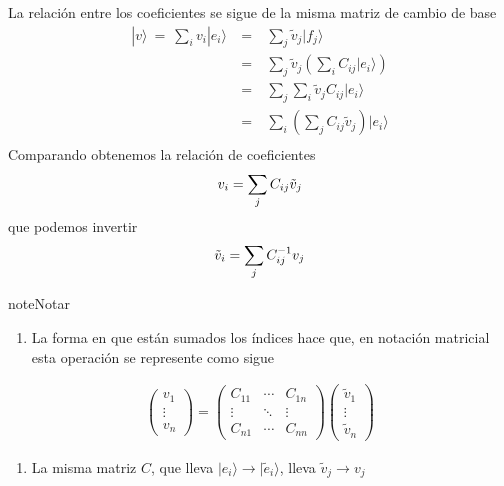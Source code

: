 \documentclass[letterpaper,10pt,english]{jupyterBook}
\newcommand{\ket}[1]{|#1\rangle}
\begin{document}
\sphinxAtStartPar
La relación entre los coeficientes se sigue de la misma matriz de cambio de base
\begin{eqnarray*}
\ket{v}  ~= ~ \sum_{i} v_i \ket{e_i} &~=~& \sum_j \tilde v_j \ket{f_j} \nonumber\\
&~=~&  \sum_j \tilde v_j \left( \sum_{i} C_{ij} \ket{e_i}\right) \nonumber \\
&~=~&  \sum_{j}\sum_{i} \tilde v_j   C_{ij} \ket{e_i} \nonumber \\
&~=~& \sum_i \left( \sum_j C_{ij} \tilde v_j \right) \ket{e_i}  \nonumber \\
\end{eqnarray*}
\sphinxAtStartPar
Comparando obtenemos la relación de coeficientes
\begin{equation*}
\begin{split}
v_i = \sum_{j} C_{i\color{black}{j}} \tilde v_{\color{black}{j}}
\end{split}
\end{equation*}
\sphinxAtStartPar
que podemos invertir
\begin{equation*}
\begin{split}
\tilde v_i = \sum_{j} C^{-1}_{i\color{black}{j}} v_{\color{black}{j}}
\end{split}
\end{equation*}
\begin{sphinxadmonition}{note}{Notar}
\begin{enumerate}
%
\item {} 
\sphinxAtStartPar
La forma en que están sumados los índices hace que, en notación matricial esta operación se represente como sigue

\end{enumerate}
\begin{equation*}
\begin{split}
\begin{pmatrix} v_1\\ \vdots \\ v_n\end{pmatrix} = 
\begin{pmatrix} C_{11} & \cdots & C_{1n} \\ \vdots & \ddots & \vdots \\ C_{n1} & \cdots & C_{nn} \end{pmatrix}
\begin{pmatrix} \tilde v_1\\ \vdots \\ \tilde v_n\end{pmatrix}
\end{split}
\end{equation*}\begin{enumerate}
%
\setcounter{enumi}{1}
\item {} 
\sphinxAtStartPar
La misma matriz \(C\), que lleva \(\ket{e_i} \to \ket{\tilde e_i}\), lleva \(\tilde v_j \to v_j\)

\end{enumerate}
\end{sphinxadmonition}
\end{document}
